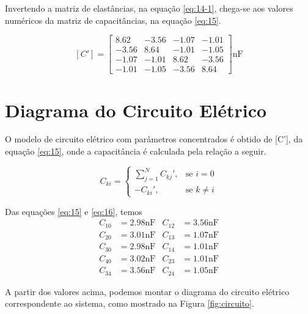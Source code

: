 \documentclass{aleph-revista}
\begin{document}
Invertendo a matriz de elastâncias, na equação \eqref{eq:14-1}, chega-se aos valores numéricos da matriz de capacitâncias, na equação \eqref{eq:15}.

\begin{equation}\label{eq:15}
  [C'] =
  \begin{bmatrix}
    8.62  & -3.56 & -1.07 & -1.01 \\
    -3.56 & 8.64  & -1.01 & -1.05 \\
    -1.07 & -1.01 & 8.62  & -3.56 \\
    -1.01 & -1.05 & -3.56 & 8.64
  \end{bmatrix}
  \textrm{nF}
\end{equation}

\bigskip
\medskip

\section{Diagrama do Circuito Elétrico}

O modelo de circuito elétrico com parâmetros concentrados é obtido de [C'], da equação \eqref{eq:15}, onde a capacitância é calculada pela relação a seguir.

\begin{equation}\label{eq:16}
  C_{ki} =
  \begin{cases}
    \displaystyle \sum_{j=1}^N C_{kj}', & \text{se } i=0      \\
    \displaystyle -C_{ki}',             & \text{se } k \neq i
  \end{cases}
\end{equation}

Das equações \eqref{eq:15} e \eqref{eq:16}, temos
\begin{align*}
  C_{10} & = 2.98 \textrm{nF} & C_{12} & = 3.56 \textrm{nF} \\
  C_{20} & = 3.01 \textrm{nF} & C_{13} & = 1.07 \textrm{nF} \\
  C_{30} & = 2.98 \textrm{nF} & C_{14} & = 1.01 \textrm{nF} \\
  C_{40} & = 3.02 \textrm{nF} & C_{23} & = 1.01 \textrm{nF} \\
  C_{34} & = 3.56 \textrm{nF} & C_{24} & = 1.05 \textrm{nF}
\end{align*}

A partir dos valores acima, podemos montar o diagrama do circuito elétrico correspondente ao sistema, como mostrado na Figura \ref{fig:circuito}.
\end{document}
